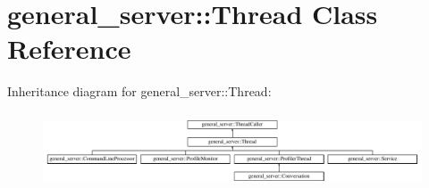 \hypertarget{classgeneral__server_1_1Thread}{\section{general\-\_\-server\-:\-:\-Thread \-Class \-Reference}
\label{classgeneral__server_1_1Thread}
}
\-Inheritance diagram for general\-\_\-server\-:\-:\-Thread\-:\begin{figure}[H]
\begin{center}
\leavevmode
\includegraphics[height=2.240000cm]{classgeneral__server_1_1Thread}
\end{center}
\end{figure}
